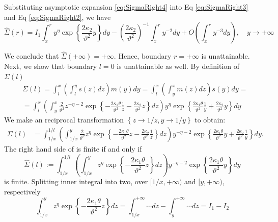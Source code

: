 \documentclass[pdftex,11pt,a4paper] {article}
\begin{document}
Substituting asymptotic expansion \eqref{eq:SigmaRight4} into Eq \eqref{eq:SigmaRight3} and Eq \eqref{eq:SigmaRight2}, we have
\begin{equation*}%
\widehat\Sigma(r)=I_1
\int_x^ry^\eta\exp\left\{\frac{2\kappa_2}{\vartheta^2}y\right\}dy-
\left(\frac{2\kappa_2}{\vartheta^2}\right)^{-1}\int_x^ry^{-2}dy+O\left(\int_x^ry^{-3}dy\right),\quad y\to +\infty
\end{equation*}

We conclude that $\widehat\Sigma(+\infty)=+\infty$. Hence, boundary $r=+\infty$ is unattainable. 
Next, we show that boundary $l=0$ is unattainable as well. By definition of $\Sigma(l)$
\begin{equation*}%
\begin{split}
&\Sigma(l)=\int_l^x\left(\int_l^y s(z)dz\right)m(y)dy=
\int_l^x\left(\int_y^x m(z)dz\right)s(y)dy=\\
&=\int_l^x\left(\int_y^x \frac{2}{\vartheta^2}z^{-\eta-2}\exp\left\{-\frac{2\kappa_1\theta}{\vartheta^2}\frac{1}{z}-\frac{2\kappa_2}{\vartheta^2}z\right\}dz\right)y^\eta\exp\left\{\frac{2\kappa_1\theta}{\vartheta^2}\frac{1}{y}+\frac{2\kappa_2}{\vartheta^2}y\right\}dy
\end{split}
\end{equation*}
We make an reciprocal transformation $\left\{z\to 1/z, y\to 1/y\right\}$ to obtain:
\begin{equation*}%
\begin{split}
\Sigma(l)&=\int_{1/x}^{1/l}\left(\int_{1/x}^y \frac{2}{\vartheta^2}z^{\eta}\exp\left\{-\frac{2\kappa_1\theta}{\vartheta^2}z-\frac{2\kappa_2}{\vartheta^2}\frac{1}{z}\right\}dz\right)y^{-\eta-2}\exp\left\{\frac{2\kappa_1\theta}{\vartheta^2}y+\frac{2\kappa_2}{\vartheta^2}\frac{1}{y}\right\}dy.
\end{split}
\end{equation*}
The right hand side of is finite if and only if
\begin{equation}\label{eq:SigmaLeft2}
\widehat\Sigma(l):=\int_{1/x}^{1/l}\left(\int_{1/x}^y z^{\eta}\exp\left\{-\frac{2\kappa_1\theta}{\vartheta^2}z\right\}dz\right)y^{-\eta-2}\exp\left\{\frac{2\kappa_1\theta}{\vartheta^2}y\right\}dy
\end{equation}
is finite. Splitting inner integral into two, over $[1/x,+\infty)$ and $[y,+\infty)$, respectively
\begin{equation}\label{eq:SigmaLeft3}
\int_{1/x}^{y}z^{\eta}\exp\left\{-\frac{2\kappa_1\theta}{\vartheta^2}z\right\}dz=
\int_{1/x}^{+\infty} \cdots dz-\int_{y}^{+\infty} \cdots dz=I_1-I_2
\end{equation}
\end{document}

